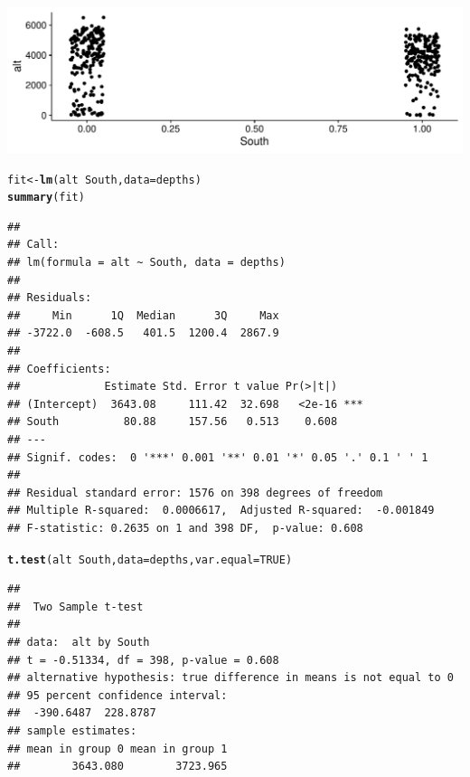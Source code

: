 \documentclass[landscape,twocolumn,letterpaper,9pt,reqno]{article}\usepackage[]{graphicx}\usepackage[]{color}
\newcommand{\hlnum}[1]{\textcolor[rgb]{0.686,0.059,0.569}{#1}}%
\newcommand{\hlopt}[1]{\textcolor[rgb]{0,0,0}{#1}}%
\newcommand{\hlstd}[1]{\textcolor[rgb]{0.345,0.345,0.345}{#1}}%
\newcommand{\hlkwb}[1]{\textcolor[rgb]{0.69,0.353,0.396}{#1}}%
\newcommand{\hlkwc}[1]{\textcolor[rgb]{0.333,0.667,0.333}{#1}}%
\newcommand{\hlkwd}[1]{\textcolor[rgb]{0.737,0.353,0.396}{\textbf{#1}}}%
\newenvironment{knitrout}{}{} %
\begin{document}
\begin{knitrout}
\color{fgcolor}

{\centering \includegraphics[width=1\linewidth]{figure/unnamed-chunk-3-1} 

}



\end{knitrout}


\begin{knitrout}\footnotesize
{}\color{fgcolor}
\begin{alltt}
\hlstd{fit} \hlkwb{<-} \hlkwd{lm}\hlstd{(alt} \hlopt{~} \hlstd{South,} \hlkwc{data} \hlstd{= depths)}
\hlkwd{summary}\hlstd{(fit)}
\end{alltt}
\begin{verbatim}
## 
## Call:
## lm(formula = alt ~ South, data = depths)
## 
## Residuals:
##     Min      1Q  Median      3Q     Max 
## -3722.0  -608.5   401.5  1200.4  2867.9 
## 
## Coefficients:
##             Estimate Std. Error t value Pr(>|t|)    
## (Intercept)  3643.08     111.42  32.698   <2e-16 ***
## South          80.88     157.56   0.513    0.608    
## ---
## Signif. codes:  0 '***' 0.001 '**' 0.01 '*' 0.05 '.' 0.1 ' ' 1
## 
## Residual standard error: 1576 on 398 degrees of freedom
## Multiple R-squared:  0.0006617,	Adjusted R-squared:  -0.001849 
## F-statistic: 0.2635 on 1 and 398 DF,  p-value: 0.608
\end{verbatim}
\begin{alltt}
\hlkwd{t.test}\hlstd{(alt} \hlopt{~} \hlstd{South,} \hlkwc{data} \hlstd{= depths,} \hlkwc{var.equal} \hlstd{=} \hlnum{TRUE}\hlstd{)}
\end{alltt}
\begin{verbatim}
## 
## 	Two Sample t-test
## 
## data:  alt by South
## t = -0.51334, df = 398, p-value = 0.608
## alternative hypothesis: true difference in means is not equal to 0
## 95 percent confidence interval:
##  -390.6487  228.8787
## sample estimates:
## mean in group 0 mean in group 1 
##        3643.080        3723.965
\end{verbatim}

\end{knitrout}
\end{document}
